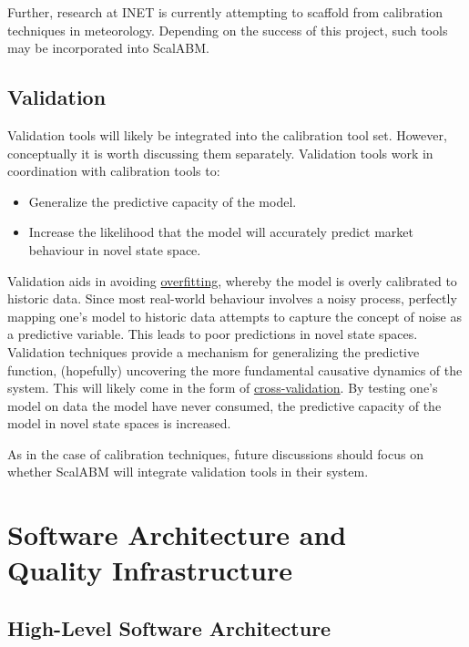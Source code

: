 \documentclass[a4paper]{article}
\begin{document}
Further, research at INET is currently attempting to scaffold from calibration techniques in meteorology. Depending on the success of this project, such tools may be incorporated into ScalABM.

\subsection{Validation}
\label{Validation}

Validation tools will likely be integrated into the calibration tool set. However, conceptually it is worth discussing them separately. Validation tools work in coordination with calibration tools to: 

\begin{itemize}
    \item Generalize the predictive capacity of the model.
    \item Increase the likelihood that the model will accurately predict market behaviour in novel state space.
\end{itemize}

Validation aids in avoiding \href{http://en.wikipedia.org/wiki/Overfitting}{overfitting}, whereby the model is overly calibrated to historic data. Since most real-world behaviour involves a noisy process, perfectly mapping one's model to historic data attempts to capture the concept of noise as a predictive variable. This leads to poor predictions in novel state spaces. Validation techniques provide a mechanism for generalizing the predictive function, (hopefully) uncovering the more fundamental causative dynamics of the system. This will likely come in the form of \href{http://en.wikipedia.org/wiki/Cross-validation_(statistics)}{cross-validation}. By testing one's model on data the model have never consumed, the predictive capacity of the model in novel state spaces is increased.

As in the case of calibration techniques, future discussions should focus on whether ScalABM will integrate validation tools in their system.

\section{Software Architecture and \\ Quality Infrastructure}

\subsection{High-Level Software Architecture}
\end{document}

